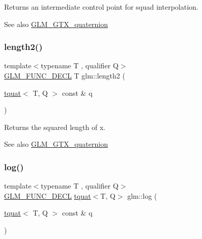 Returns an intermediate control point for squad interpolation.

\begin{DoxySeeAlso}{See also}
\mbox{\hyperlink{group__gtx__quaternion}{G\+L\+M\+\_\+\+G\+T\+X\+\_\+quaternion}} 
\end{DoxySeeAlso}
\mbox{\label{group__gtx__quaternion_ga229bacc3051770b030042fe266f7b0cb}} 
\subsubsection{\texorpdfstring{length2()}{length2()}}
{\footnotesize\ttfamily template$<$typename T , qualifier Q$>$ \\
\mbox{\hyperlink{setup_8hpp_ab2d052de21a70539923e9bcbf6e83a51}{G\+L\+M\+\_\+\+F\+U\+N\+C\+\_\+\+D\+E\+CL}} T glm\+::length2 (\begin{DoxyParamCaption}\item[{\mbox{\hyperlink{structglm_1_1tquat}{tquat}}$<$ T, Q $>$ const \&}]{q }\end{DoxyParamCaption})}

Returns the squared length of x.

\begin{DoxySeeAlso}{See also}
\mbox{\hyperlink{group__gtx__quaternion}{G\+L\+M\+\_\+\+G\+T\+X\+\_\+quaternion}} 
\end{DoxySeeAlso}
\mbox{\label{group__gtx__quaternion_gaad510f1a4ea26994b341c094ec4f4eed}} 
\subsubsection{\texorpdfstring{log()}{log()}}
{\footnotesize\ttfamily template$<$typename T , qualifier Q$>$ \\
\mbox{\hyperlink{setup_8hpp_ab2d052de21a70539923e9bcbf6e83a51}{G\+L\+M\+\_\+\+F\+U\+N\+C\+\_\+\+D\+E\+CL}} \mbox{\hyperlink{structglm_1_1tquat}{tquat}}$<$T, Q$>$ glm\+::log (\begin{DoxyParamCaption}\item[{\mbox{\hyperlink{structglm_1_1tquat}{tquat}}$<$ T, Q $>$ const \&}]{q }\end{DoxyParamCaption})}

